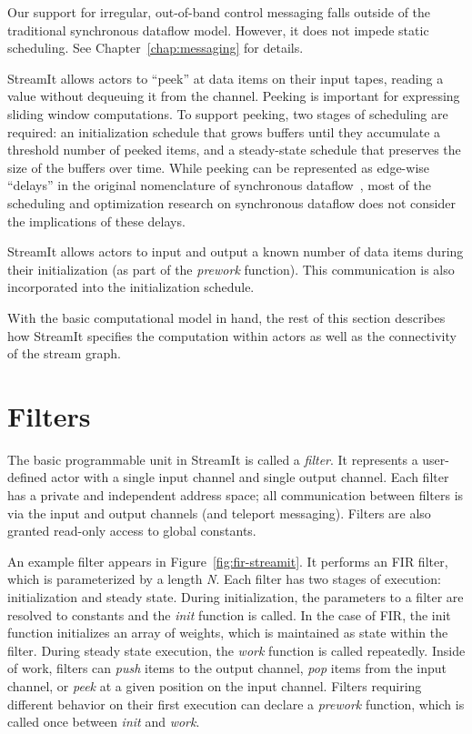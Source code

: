   Our support for irregular,
  out-of-band control messaging falls outside of the traditional
  synchronous dataflow model.  However, it does not impede static
  scheduling.  See Chapter~\ref{chap:messaging} for details.

  StreamIt allows actors to ``peek'' at data items 
  on their input tapes, reading a value without dequeuing it from the
  channel.  Peeking is important for expressing sliding window
  computations.  To support peeking, two stages of scheduling are
  required: an initialization schedule that grows buffers until they
  accumulate a threshold number of peeked items, and a steady-state
  schedule that preserves the size of the buffers over time.  While
  peeking can be represented as edge-wise ``delays'' in the original
  nomenclature of synchronous dataflow~\cite{lee_static_1987}, most of
  the scheduling and optimization research on synchronous dataflow
  does not consider the implications of these delays.

  StreamIt allows
  actors to input and output a known number of data items during their
  initialization (as part of the {\it prework} function).  This
  communication is also incorporated into the initialization schedule.

\myend

With the basic computational model in hand, the rest of this section
describes how StreamIt specifies the computation within actors as well
as the connectivity of the stream graph.

\section{Filters}
\label{sec:filters}
\enlargethispage{0.3\baselineskip}

The basic programmable unit in StreamIt is called a {\it filter}.  It
represents a user-defined actor with a single input channel and single
output channel.  Each filter has a private and independent address
space; all communication between filters is via the input and output
channels (and teleport messaging).  Filters are also granted read-only
access to global constants.

An example filter appears in Figure~\ref{fig:fir-streamit}.  It
performs an FIR filter, which is parameterized by a length {\it N}.
Each filter has two stages of execution: initialization and steady
state.  During initialization, the parameters to a filter are resolved
to constants and the {\it init} function is called.  In the case of
FIR, the init function initializes an array of weights, which is
maintained as state within the filter.  During steady state execution,
the {\it work} function is called repeatedly.  Inside of work, filters
can {\it push} items to the output channel, {\it pop} items from the
input channel, or {\it peek} at a given position on the input channel.
Filters requiring different behavior on their first execution can
declare a {\it prework} function, which is called once between {\it
init} and {\it work}.

